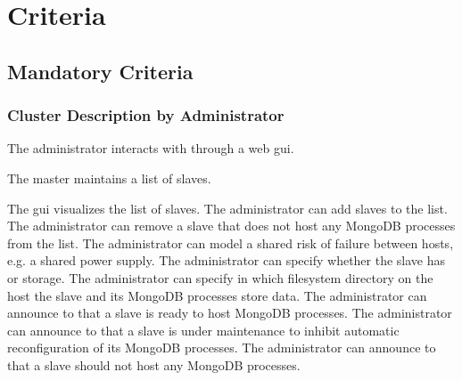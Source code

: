 \section{Criteria}
\subsection{Mandatory Criteria}
\subsubsection{Cluster Description by Administrator}
\begin{description}
	
	 The administrator interacts with \mamid through a web gui. \done
	
	 The master maintains a list of slaves. \done
	\begin{description}
		 The gui visualizes the list of slaves. \done
		 The administrator can add slaves to the list. \done
		 The administrator can remove a slave that does not host any MongoDB processes from the 
		list. \done
		 The administrator can model a shared risk of failure between hosts, e.g. a shared power 
		supply. \done
		 The administrator can specify whether the slave has  or  storage. \done
		 The administrator can specify in which filesystem directory on the host the slave 
		and its MongoDB processes store data. %
		 The administrator can announce to \mamid that a slave is ready to host MongoDB processes. 
		\done
		 The administrator can announce to \mamid that a slave is under maintenance to inhibit 
		automatic reconfiguration of its MongoDB processes. \done %
		 The administrator can announce to \mamid that a slave should not host any MongoDB processes. 
		\done
	\end{description}
	

\end{description}
